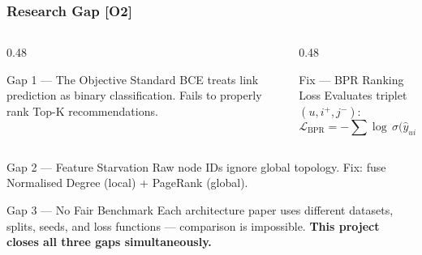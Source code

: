 \documentclass[10pt,aspectratio=43]{beamer}
\begin{document}
\begin{frame}
\frametitle{Research Gap \textbf{[O2]}}
\begin{columns}[T]
\begin{column}{0.48\textwidth}
\begin{alertblock}{Gap 1 --- The Objective}
Standard BCE treats link prediction as binary classification.
Fails to properly \alert{rank} Top-K recommendations.
\end{alertblock}
\end{column}
\begin{column}{0.48\textwidth}
\begin{exampleblock}{Fix --- BPR Ranking Loss}
Evaluates triplet $(u, i^+, j^-)$:
\[ \mathcal{L}_{\text{BPR}} = -\sum \log\,\sigma\!\bigl(\hat{y}_{ui} - \hat{y}_{uj}\bigr) \]
\end{exampleblock}
\end{column}
\end{columns}
\vspace{0.3em}
\begin{block}{Gap 2 --- Feature Starvation}
Raw node IDs ignore global topology.
Fix: fuse \alert{Normalised Degree} (local) + \alert{PageRank} (global).
\end{block}
\begin{alertblock}{Gap 3 --- No Fair Benchmark}
Each architecture paper uses different datasets, splits, seeds, and loss functions --- comparison is impossible. \textbf{This project closes all three gaps simultaneously.}
\end{alertblock}
\end{frame}
\end{document}
